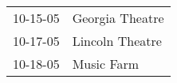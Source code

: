 \begin{supertabular}{p{0.25\columnwidth}p{0.75\columnwidth}}
 10-15-05 &  Georgia Theatre \\
 10-17-05 &  Lincoln Theatre \\
 10-18-05 &       Music Farm \\
\end{supertabular}
